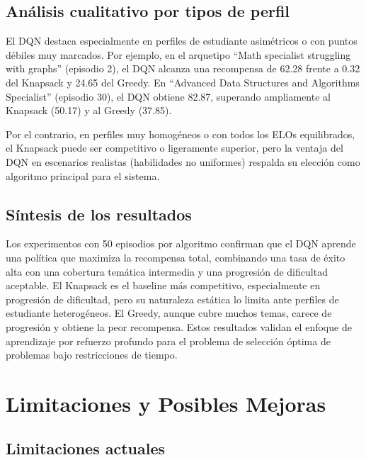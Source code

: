 \documentclass[12pt, a4paper]{article}
\begin{document}
\subsection{Análisis cualitativo por tipos de perfil}

El DQN destaca especialmente en perfiles de estudiante asimétricos o con
puntos débiles muy marcados. Por ejemplo, en el arquetipo
``Math specialist struggling with graphs'' (episodio 2), el DQN alcanza una
recompensa de 62.28 frente a 0.32 del Knapsack y 24.65 del Greedy. En
``Advanced Data Structures and Algorithms Specialist'' (episodio 30), el DQN
obtiene 82.87, superando ampliamente al Knapsack (50.17) y al Greedy (37.85).

Por el contrario, en perfiles muy homogéneos o con todos los ELOs equilibrados,
el Knapsack puede ser competitivo o ligeramente superior, pero la ventaja del
DQN en escenarios realistas (habilidades no uniformes) respalda su elección
como algoritmo principal para el sistema.

\subsection{Síntesis de los resultados}

Los experimentos con 50 episodios por algoritmo confirman que el DQN aprende
una política que maximiza la recompensa total, combinando una tasa de éxito
alta con una cobertura temática intermedia y una progresión de dificultad
aceptable. El Knapsack es el baseline más competitivo, especialmente en
progresión de dificultad, pero su naturaleza estática lo limita ante perfiles
de estudiante heterogéneos. El Greedy, aunque cubre muchos temas, carece de
progresión y obtiene la peor recompensa. Estos resultados validan el enfoque
de aprendizaje por refuerzo profundo para el problema de selección óptima de
problemas bajo restricciones de tiempo.

\section{Limitaciones y Posibles Mejoras}

\subsection{Limitaciones actuales}
\end{document}
